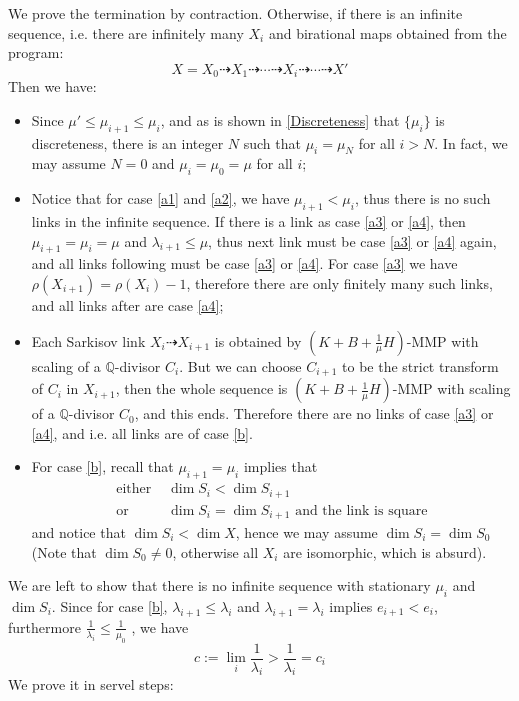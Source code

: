 \documentclass{article}
\begin{document}
We prove the termination by contraction. Otherwise, if there is an infinite sequence, i.e. there are infinitely many $ X_i $ and birational maps obtained from the program:
\[ X=X_0\dashrightarrow X_1\dashrightarrow \cdots\dashrightarrow X_i \dashrightarrow\cdots\dashrightarrow X'\]
Then we have:
\begin{itemize}
  \item Since $ \mu'\leqslant\mu_{i+1}\leqslant \mu_i $, and as is shown in \ref{Discreteness} that $ \{\mu_i\} $ is discreteness, there is an integer $ N $ such that $ \mu_i=\mu_N $ for all $ i>N $. In fact, we may assume $ N=0 $ and $ \mu_i=\mu_0=\mu $ for all $ i $;
  \item  Notice that for case \ref{a1} and \ref{a2}, we have $ \mu_{i+1}<\mu_i $, thus there is no such links in the infinite sequence. If there is a link as case \ref{a3} or \ref{a4}, then $ \mu_{i+1}=\mu_i=\mu  $ and $ \lambda_{i+1}\leqslant \mu $, thus next link must be case \ref{a3} or \ref{a4} again, and  all links following must be case \ref{a3} or \ref{a4}. For case \ref{a3} we have $ \rho(X_{i+1})=\rho(X_i)-1 $, therefore there are only finitely many such links, and all links after are  case \ref{a4};
  \item  Each Sarkisov link $X_{i}\dashrightarrow X_{i+1}$ is obtained by $ (K+B+\frac{1}{\mu}H) $-MMP with scaling of a $\mathbb{Q}$-divisor $C_{i}$.  But we can choose $C_{i+1}$ to be the strict transform of $C_{i}$ in $X_{i+1}$, then the whole sequence is  $ (K+B+\frac{1}{\mu}H) $-MMP with scaling of a $\mathbb{Q}$-divisor $C_{0}$, and this ends. Therefore there are no links of case \ref{a3} or \ref{a4}, and i.e. all links are of case \ref{b}.
  \item For case \ref{b}, recall that $ \mu_{i+1}=\mu_i $ implies that
\[
  \begin{aligned}
    \text{either } &\dim S_i<\dim S_{i+1} \\
    \text{or }&\dim S_i=\dim S_{i+1} \text{ and the link is square} 
  \end{aligned}
\]
and notice that $ \dim S_i< \dim X $, hence we may assume $ \dim S_i=\dim S_0 $ (Note that $ \dim S_0 \neq 0$, otherwise all $ X_i $ are isomorphic, which is absurd).
\end{itemize}
We are left to show that there is no infinite sequence with stationary $ \mu_i $ and $ \dim S_i $. Since for case \ref{b}, $ \lambda_{i+1}\leqslant \lambda_i $ and $ \lambda_{i+1}=\lambda_i $ implies $ e_{i+1}<e_i $, furthermore $ \frac{1}{\lambda_i}\leqslant \frac{1}{\mu_0} $ , we have
\[ c:=\lim_{i}\frac{1}{\lambda_i}>\frac{1}{\lambda_i}=c_i \]
We prove it in servel steps:
\end{document}
